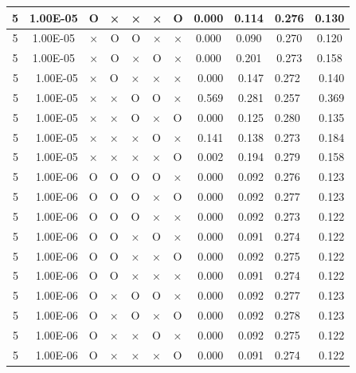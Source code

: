 \documentclass[11pt]{article}
\begin{document}
\begin{longtable}[h]{|r|r|l|l|l|l|l|r|r|l|r|}
\multicolumn{1}{|c|}{5} & \multicolumn{1}{c|}{1.00E-05} & \multicolumn{1}{c|}{O} & \multicolumn{1}{c|}{×} & \multicolumn{1}{c|}{×} & \multicolumn{1}{c|}{×} & \multicolumn{1}{c|}{O} & \multicolumn{1}{c|}{0.000} & \multicolumn{1}{c|}{0.114} & \multicolumn{1}{c|}{0.276} & \multicolumn{1}{c|}{0.130} \\ \hline
\multicolumn{1}{|c|}{5} & \multicolumn{1}{c|}{1.00E-05} & \multicolumn{1}{c|}{×} & \multicolumn{1}{c|}{O} & \multicolumn{1}{c|}{O} & \multicolumn{1}{c|}{×} & \multicolumn{1}{c|}{×} & \multicolumn{1}{c|}{0.000} & \multicolumn{1}{c|}{0.090} & \multicolumn{1}{c|}{0.270} & \multicolumn{1}{c|}{0.120} \\ \hline
\multicolumn{1}{|c|}{5} & \multicolumn{1}{c|}{1.00E-05} & \multicolumn{1}{c|}{×} & \multicolumn{1}{c|}{O} & \multicolumn{1}{c|}{×} & \multicolumn{1}{c|}{O} & \multicolumn{1}{c|}{×} & \multicolumn{1}{c|}{0.000} & \multicolumn{1}{c|}{0.201} & \multicolumn{1}{c|}{0.273} & \multicolumn{1}{c|}{0.158} \\ \hline
5 & 1.00E-05 & × & O & × & × & × & 0.000 & 0.147 & 0.272 & 0.140 \\
5 & 1.00E-05 & × & × & O & O & × & 0.569 & 0.281 & 0.257 & 0.369 \\
5 & 1.00E-05 & × & × & O & × & O & 0.000 & 0.125 & 0.280 & 0.135 \\
5 & 1.00E-05 & × & × & × & O & × & 0.141 & 0.138 & 0.273 & 0.184 \\
5 & 1.00E-05 & × & × & × & × & O & 0.002 & 0.194 & 0.279 & 0.158 \\
5 & 1.00E-06 & O & O & O & O & × & 0.000 & 0.092 & 0.276 & 0.123 \\
5 & 1.00E-06 & O & O & O & × & O & 0.000 & 0.092 & 0.277 & 0.123 \\
5 & 1.00E-06 & O & O & O & × & × & 0.000 & 0.092 & 0.273 & 0.122 \\
5 & 1.00E-06 & O & O & × & O & × & 0.000 & 0.091 & 0.274 & 0.122 \\
5 & 1.00E-06 & O & O & × & × & O & 0.000 & 0.092 & 0.275 & 0.122 \\
5 & 1.00E-06 & O & O & × & × & × & 0.000 & 0.091 & 0.274 & 0.122 \\
5 & 1.00E-06 & O & × & O & O & × & 0.000 & 0.092 & 0.277 & 0.123 \\
5 & 1.00E-06 & O & × & O & × & O & 0.000 & 0.092 & 0.278 & 0.123 \\
5 & 1.00E-06 & O & × & × & O & × & 0.000 & 0.092 & 0.275 & 0.122 \\
5 & 1.00E-06 & O & × & × & × & O & 0.000 & 0.091 & 0.274 & 0.122 \\

\end{longtable}
\end{document}
